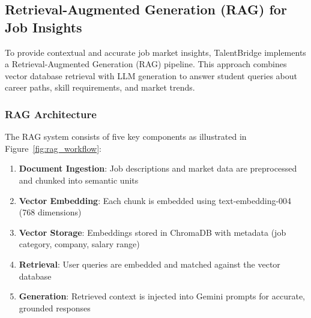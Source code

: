 

\subsection{Retrieval-Augmented Generation (RAG) for Job Insights}

To provide contextual and accurate job market insights, TalentBridge implements a Retrieval-Augmented Generation (RAG) pipeline. This approach combines vector database retrieval with LLM generation to answer student queries about career paths, skill requirements, and market trends.

\subsubsection{RAG Architecture}

The RAG system consists of five key components as illustrated in Figure~\ref{fig:rag_workflow}:

\begin{enumerate}
\item \textbf{Document Ingestion}: Job descriptions and market data are preprocessed and chunked into semantic units
\item \textbf{Vector Embedding}: Each chunk is embedded using text-embedding-004 (768 dimensions)
\item \textbf{Vector Storage}: Embeddings stored in ChromaDB with metadata (job category, company, salary range)
\item \textbf{Retrieval}: User queries are embedded and matched against the vector database
\item \textbf{Generation}: Retrieved context is injected into Gemini prompts for accurate, grounded responses
\end{enumerate}

